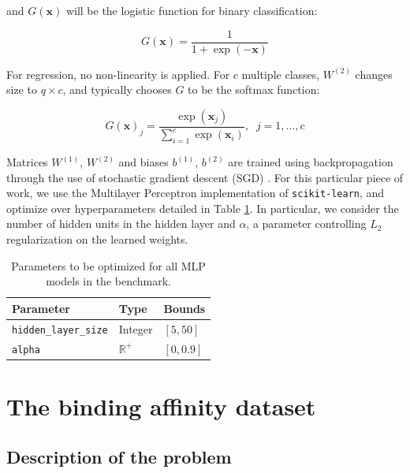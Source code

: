 \documentclass[10pt,a4paper,twoside]{book}
\begin{document}
and $G(\boldsymbol{x})$ will be the logistic function for binary classification:

\begin{equation}
G(\boldsymbol{x}) = \dfrac{1}{1 + \exp(-\boldsymbol{x})}
\end{equation} 

For regression, no non-linearity is applied. For $c$ multiple classes, $W^{(2)}$ changes size to $q \times c$, and typically chooses $G$ to be the softmax function:

\begin{equation}
G(\boldsymbol{x})_j = \dfrac{\exp(\boldsymbol{x}_j)}{\sum_{i=1}^c \exp(\boldsymbol{x}_i)}, \;\; j=1,\dots,c
\end{equation}

Matrices $W^{(1)}$, $W^{(2)}$ and biases $b^{(1)}$, $b^{(2)}$ are trained using backpropagation \cite{Rumelhart1986} through the use of stochastic gradient descent (SGD) \cite{Bottou2003}. For this particular piece of work, we use the Multilayer Perceptron implementation of \texttt{scikit-learn}, and optimize over hyperparameters detailed in Table \ref{mlpparam}. In particular, we consider the number of hidden units in the hidden layer and $\alpha$, a parameter controlling $L_2$ regularization on the learned weights.

\begin{table}[]
\centering
\caption{Parameters to be optimized for all MLP models in the benchmark.}
\label{mlpparam}
\begin{tabular}{lll}
\hline
\textbf{Parameter}             & \textbf{Type}    & \textbf{Bounds}       \\ \hline
\texttt{hidden\_layer\_size} & Integer          & $\left[5, 50\right]$  \\
\texttt{alpha}               & $\mathbb{R}^{+}$ & $\left[0, 0.9\right]$
\end{tabular}
\end{table}


\section{The binding affinity dataset}

\subsection{Description of the problem}
\end{document}
